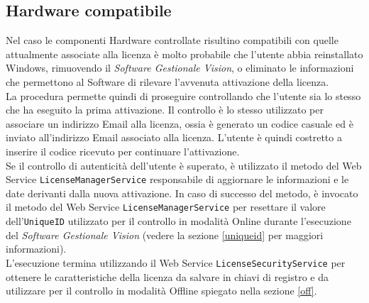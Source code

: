 \subsection{Hardware compatibile}
\label{hc}
Nel caso le componenti Hardware controllate risultino compatibili con quelle attualmente associate alla licenza è molto probabile che l'utente abbia reinstallato Windows, rimuovendo il \textit{Software Gestionale Vision}, o eliminato le informazioni che permettono al Software di rilevare l'avvenuta attivazione della licenza. 
\\La procedura permette quindi di proseguire controllando che l'utente sia lo stesso che ha eseguito la prima attivazione. Il controllo è lo stesso utilizzato per associare un indirizzo Email alla licenza, ossia è generato un codice casuale ed è inviato all'indirizzo Email associato alla licenza. L'utente è quindi costretto a inserire il codice ricevuto per continuare l'attivazione.
\\Se il controllo di autenticità dell'utente è superato, è utilizzato il metodo del Web Service \texttt{LicenseManagerService} responsabile di aggiornare le informazioni e le date derivanti dalla nuova attivazione. In caso di successo del metodo, è invocato il metodo del Web Service \texttt{LicenseManagerService} per resettare il valore dell’\texttt{UniqueID} utilizzato per il controllo in modalità Online durante l’esecuzione del \textit{Software Gestionale Vision} (vedere la sezione \ref{uniqueid} per maggiori informazioni).\\
L’esecuzione termina utilizzando il Web Service \texttt{LicenseSecurityService} per ottenere le caratteristiche della licenza da salvare in chiavi di registro e da utilizzare per il controllo in modalità Offline spiegato nella sezione \ref{off}. 


